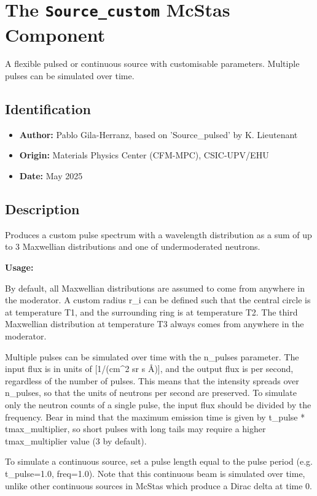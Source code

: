 \section{The \texttt{Source\_custom} McStas Component}
A flexible pulsed or continuous source with customisable parameters. Multiple pulses can be simulated over time.

\subsection*{Identification}
\begin{itemize}
  \item \textbf{Author:} Pablo Gila-Herranz, based on 'Source\_pulsed' by K. Lieutenant
  \item \textbf{Origin:} Materials Physics Center (CFM-MPC), CSIC-UPV/EHU
  \item \textbf{Date:} May 2025
\end{itemize}

\subsection*{Description}
Produces a custom pulse spectrum with a wavelength distribution as a sum of up to 3 Maxwellian distributions and one of undermoderated neutrons.

\textbf{Usage:}

By default, all Maxwellian distributions are assumed to come from anywhere in the moderator. A custom radius r\_i can be defined such that the central circle is at temperature T1, and the surrounding ring is at temperature T2. The third Maxwellian distribution at temperature T3 always comes from anywhere in the moderator.

Multiple pulses can be simulated over time with the n\_pulses parameter. The input flux is in units of [1/(cm\textasciicircum{}2 sr s \AA{})], and the output flux is per second, regardless of the number of pulses. This means that the intensity spreads over n\_pulses, so that the units of neutrons per second are preserved. To simulate only the neutron counts of a single pulse, the input flux should be divided by the frequency. Bear in mind that the maximum emission time is given by t\_pulse * tmax\_multiplier, so short pulses with long tails may require a higher tmax\_multiplier value (3 by default).

To simulate a continuous source, set a pulse length equal to the pulse period (e.g. t\_pulse=1.0, freq=1.0). Note that this continuous beam is simulated over time, unlike other continuous sources in McStas which produce a Dirac delta at time 0.

